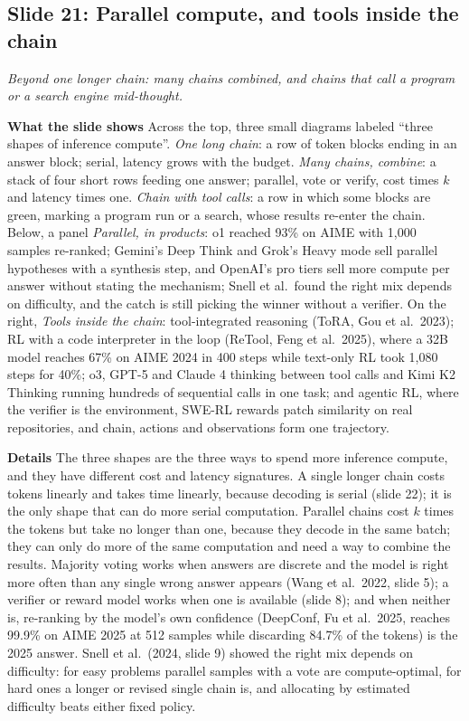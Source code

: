 \documentclass[11pt,letterpaper]{article}
\newcommand{\slide}[3]{%
  \subsection[Slide #1: #2]{Slide #1: #2}%
  {\color{muted}\itshape #3\par}\medskip}
\newcommand{\para}[1]{\medskip\noindent\textbf{#1}\quad}
\begin{document}
\slide{21}{Parallel compute, and tools inside the chain}{Beyond one longer chain: many chains combined, and chains that call a program or a search engine mid-thought.}

\para{What the slide shows} Across the top, three small diagrams labeled ``three shapes of inference compute''. \emph{One long chain}: a row of token blocks ending in an answer block; serial, latency grows with the budget. \emph{Many chains, combine}: a stack of four short rows feeding one answer; parallel, vote or verify, cost times $k$ and latency times one. \emph{Chain with tool calls}: a row in which some blocks are green, marking a program run or a search, whose results re-enter the chain. Below, a panel \emph{Parallel, in products}: o1 reached 93\% on AIME with 1,000 samples re-ranked; Gemini's Deep Think and Grok's Heavy mode sell parallel hypotheses with a synthesis step, and OpenAI's pro tiers sell more compute per answer without stating the mechanism; Snell et al.\ found the right mix depends on difficulty, and the catch is still picking the winner without a verifier. On the right, \emph{Tools inside the chain}: tool-integrated reasoning (ToRA, Gou et al.\ 2023); RL with a code interpreter in the loop (ReTool, Feng et al.\ 2025), where a 32B model reaches 67\% on AIME 2024 in 400 steps while text-only RL took 1,080 steps for 40\%; o3, GPT-5 and Claude 4 thinking between tool calls and Kimi K2 Thinking running hundreds of sequential calls in one task; and agentic RL, where the verifier is the environment, SWE-RL rewards patch similarity on real repositories, and chain, actions and observations form one trajectory.

\para{Details} The three shapes are the three ways to spend more inference compute, and they have different cost and latency signatures. A single longer chain costs tokens linearly and takes time linearly, because decoding is serial (slide 22); it is the only shape that can do more serial computation. Parallel chains cost $k$ times the tokens but take no longer than one, because they decode in the same batch; they can only do more of the same computation and need a way to combine the results. Majority voting works when answers are discrete and the model is right more often than any single wrong answer appears (Wang et al.\ 2022, slide 5); a verifier or reward model works when one is available (slide 8); and when neither is, re-ranking by the model's own confidence (DeepConf, Fu et al.\ 2025, reaches 99.9\% on AIME 2025 at 512 samples while discarding 84.7\% of the tokens) is the 2025 answer. Snell et al.\ (2024, slide 9) showed the right mix depends on difficulty: for easy problems parallel samples with a vote are compute-optimal, for hard ones a longer or revised single chain is, and allocating by estimated difficulty beats either fixed policy.
\end{document}
